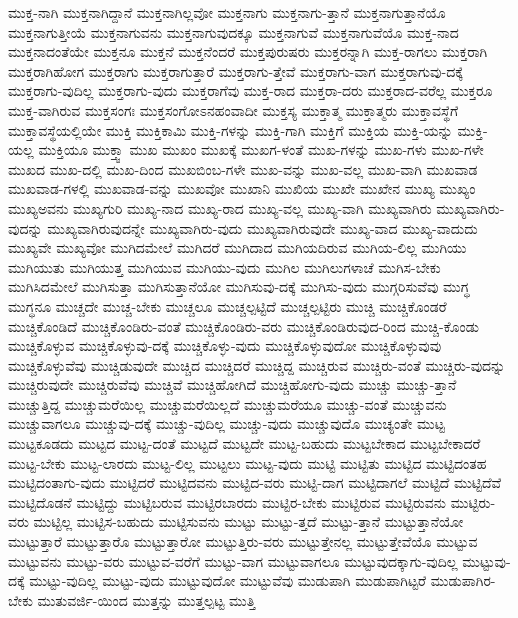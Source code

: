 {ಮುಕ್ತ-ನಾಗಿ
ಮುಕ್ತನಾಗಿದ್ದಾನೆ
ಮುಕ್ತನಾಗಿಲ್ಲವೋ
ಮುಕ್ತನಾಗು
ಮುಕ್ತನಾಗು-ತ್ತಾನೆ
ಮುಕ್ತನಾಗುತ್ತಾನೆಯೊ
ಮುಕ್ತನಾಗುತ್ತೀಯೆ
ಮುಕ್ತನಾಗುವನು
ಮುಕ್ತನಾಗುವುದಕ್ಕೂ
ಮುಕ್ತನಾಗುವೆ
ಮುಕ್ತನಾಗುವೆಯೊ
ಮುಕ್ತ-ನಾದ
ಮುಕ್ತನಾದಂತೆಯೇ
ಮುಕ್ತನೂ
ಮುಕ್ತನೆ
ಮುಕ್ತನೆಂದರೆ
ಮುಕ್ತಪುರುಷರು
ಮುಕ್ತರನ್ನಾಗಿ
ಮುಕ್ತ-ರಾಗಲು
ಮುಕ್ತರಾಗಿ
ಮುಕ್ತರಾಗಿಹೋಗ
ಮುಕ್ತರಾಗು
ಮುಕ್ತರಾಗುತ್ತಾರೆ
ಮುಕ್ತರಾಗು-ತ್ತೇವೆ
ಮುಕ್ತರಾಗು-ವಾಗ
ಮುಕ್ತರಾಗುವು-ದಕ್ಕೆ
ಮುಕ್ತರಾಗು-ವುದಿಲ್ಲ
ಮುಕ್ತರಾಗು-ವುದು
ಮುಕ್ತರಾಗೆವು
ಮುಕ್ತ-ರಾದ
ಮುಕ್ತರಾ-ದರು
ಮುಕ್ತರಾದ-ವರೆಲ್ಲ
ಮುಕ್ತರೂ
ಮುಕ್ತ-ವಾಗಿರುವ
ಮುಕ್ತಸಂಗಃ
ಮುಕ್ತಸಂಗೋಽನಹಂವಾದೀ
ಮುಕ್ತಸ್ಯ
ಮುಕ್ತಾತ್ಮ
ಮುಕ್ತಾತ್ಮರು
ಮುಕ್ತಾವಸ್ಥೆಗೆ
ಮುಕ್ತಾವಸ್ಥೆಯಲ್ಲಿಯೇ
ಮುಕ್ತಿ
ಮುಕ್ತಿಕಾಮಿ
ಮುಕ್ತಿ-ಗಳನ್ನು
ಮುಕ್ತಿ-ಗಾಗಿ
ಮುಕ್ತಿಗೆ
ಮುಕ್ತಿಯ
ಮುಕ್ತಿ-ಯನ್ನು
ಮುಕ್ತಿ-ಯಲ್ಲ
ಮುಕ್ತಿಯೂ
ಮುಕ್ತ್ವಾ
ಮುಖ
ಮುಖಂ
ಮುಖಕ್ಕೆ
ಮುಖಗ-ಳಂತೆ
ಮುಖ-ಗಳನ್ನು
ಮುಖ-ಗಳು
ಮುಖ-ಗಳೇ
ಮುಖದ
ಮುಖ-ದಲ್ಲಿ
ಮುಖ-ದಿಂದ
ಮುಖಬಿಂಬ-ಗಳೇ
ಮುಖ-ವನ್ನು
ಮುಖ-ವಲ್ಲ
ಮುಖ-ವಾಗಿ
ಮುಖವಾಡ
ಮುಖವಾಡ-ಗಳಲ್ಲಿ
ಮುಖವಾಡ-ವನ್ನು
ಮುಖವೋ
ಮುಖಾನಿ
ಮುಖಿಯ
ಮುಖೇ
ಮುಖೇನ
ಮುಖ್ಯ
ಮುಖ್ಯಂ
ಮುಖ್ಯಅವನು
ಮುಖ್ಯಗುರಿ
ಮುಖ್ಯ-ನಾದ
ಮುಖ್ಯ-ರಾದ
ಮುಖ್ಯ-ವಲ್ಲ
ಮುಖ್ಯ-ವಾಗಿ
ಮುಖ್ಯವಾಗಿರು
ಮುಖ್ಯವಾಗಿರು-ವುದನ್ನು
ಮುಖ್ಯವಾಗಿರುವುದನ್ನೇ
ಮುಖ್ಯವಾಗಿರು-ವುದು
ಮುಖ್ಯವಾಗಿರುವುದೇ
ಮುಖ್ಯ-ವಾದ
ಮುಖ್ಯ-ವಾದುದು
ಮುಖ್ಯವೇ
ಮುಖ್ಯವೋ
ಮುಗಿದಮೇಲೆ
ಮುಗಿದರೆ
ಮುಗಿದಾದ
ಮುಗಿಯದಿರುವ
ಮುಗಿಯ-ಲಿಲ್ಲ
ಮುಗಿಯು
ಮುಗಿಯುತು
ಮುಗಿಯುತ್ತ
ಮುಗಿಯುವ
ಮುಗಿಯು-ವುದು
ಮುಗಿಲ
ಮುಗಿಲುಗಳಾಚೆ
ಮುಗಿಸ-ಬೇಕು
ಮುಗಿಸಿದಮೇಲೆ
ಮುಗಿಸುತ್ತಾ
ಮುಗಿಸುತ್ತಾನೆಯೋ
ಮುಗಿಸುವು-ದಕ್ಕೆ
ಮುಗಿಸು-ವುದು
ಮುಗ್ಗರಿಸುವೆವು
ಮುಗ್ಧ
ಮುಗ್ಧನೂ
ಮುಚ್ಚದೇ
ಮುಚ್ಚ-ಬೇಕು
ಮುಚ್ಚಲೂ
ಮುಚ್ಚಲ್ಪಟ್ಟಿದೆ
ಮುಚ್ಚಲ್ಪಟ್ಟಿರು
ಮುಚ್ಚಿ
ಮುಚ್ಚಿಕೊಂಡರೆ
ಮುಚ್ಚಿಕೊಂಡಿದೆ
ಮುಚ್ಚಿಕೊಂಡಿರು-ವಂತೆ
ಮುಚ್ಚಿಕೊಂಡಿರು-ವರು
ಮುಚ್ಚಿಕೊಂಡಿರುವುದ-ರಿಂದ
ಮುಚ್ಚಿ-ಕೊಂಡು
ಮುಚ್ಚಿಕೊಳ್ಳುವ
ಮುಚ್ಚಿಕೊಳ್ಳುವು-ದಕ್ಕೆ
ಮುಚ್ಚಿಕೊಳ್ಳು-ವುದು
ಮುಚ್ಚಿಕೊಳ್ಳುವುದೋ
ಮುಚ್ಚಿಕೊಳ್ಳುವುವು
ಮುಚ್ಚಿಕೊಳ್ಳುವೆವು
ಮುಚ್ಚಿಡುವುದೇ
ಮುಚ್ಚಿದ
ಮುಚ್ಚಿದರೆ
ಮುಚ್ಚಿದ್ದ
ಮುಚ್ಚಿರುವ
ಮುಚ್ಚಿರು-ವಂತೆ
ಮುಚ್ಚಿರು-ವುದನ್ನು
ಮುಚ್ಚಿರುವುದೇ
ಮುಚ್ಚಿರುವೆವು
ಮುಚ್ಚಿವೆ
ಮುಚ್ಚಿಹೋಗಿದೆ
ಮುಚ್ಚಿಹೋಗು-ವುದು
ಮುಚ್ಚು
ಮುಚ್ಚು-ತ್ತಾನೆ
ಮುಚ್ಚುತ್ತಿದ್ದ
ಮುಚ್ಚುಮರೆಯಿಲ್ಲ
ಮುಚ್ಚುಮರೆಯಿಲ್ಲದೆ
ಮುಚ್ಚುಮರೆಯೂ
ಮುಚ್ಚು-ವಂತೆ
ಮುಚ್ಚುವನು
ಮುಚ್ಚುವಾಗಲೂ
ಮುಚ್ಚುವು-ದಕ್ಕೆ
ಮುಚ್ಚು-ವುದಿಲ್ಲ
ಮುಚ್ಚು-ವುದು
ಮುಚ್ಚುವುದೊ
ಮುಚ್ಯಂತೇ
ಮುಟ್ಟ
ಮುಟ್ಟಕೂಡದು
ಮುಟ್ಟದ
ಮುಟ್ಟ-ದಂತೆ
ಮುಟ್ಟದೆ
ಮುಟ್ಟದೇ
ಮುಟ್ಟ-ಬಹುದು
ಮುಟ್ಟಬೇಕಾದ
ಮುಟ್ಟಬೇಕಾದರೆ
ಮುಟ್ಟ-ಬೇಕು
ಮುಟ್ಟ-ಲಾರದು
ಮುಟ್ಟ-ಲಿಲ್ಲ
ಮುಟ್ಟಲು
ಮುಟ್ಟ-ವುದು
ಮುಟ್ಟಿ
ಮುಟ್ಟಿತು
ಮುಟ್ಟಿದ
ಮುಟ್ಟಿದಂತಹ
ಮುಟ್ಟಿದಂತಾಗು-ವುದು
ಮುಟ್ಟಿದರೆ
ಮುಟ್ಟಿದವನು
ಮುಟ್ಟಿದ-ವರು
ಮುಟ್ಟಿ-ದಾಗ
ಮುಟ್ಟಿದಾಗಲೆ
ಮುಟ್ಟಿದೆ
ಮುಟ್ಟಿದೆವೆ
ಮುಟ್ಟಿದೊಡನೆ
ಮುಟ್ಟಿದ್ದು
ಮುಟ್ಟಿಬರುವ
ಮುಟ್ಟಿರಬಾರದು
ಮುಟ್ಟಿರ-ಬೇಕು
ಮುಟ್ಟಿರುವ
ಮುಟ್ಟಿರುವನು
ಮುಟ್ಟಿರು-ವರು
ಮುಟ್ಟಿಲ್ಲ
ಮುಟ್ಟಿಸ-ಬಹುದು
ಮುಟ್ಟಿಸುವನು
ಮುಟ್ಟು
ಮುಟ್ಟು-ತ್ತದೆ
ಮುಟ್ಟು-ತ್ತಾನೆ
ಮುಟ್ಟುತ್ತಾನೆಯೋ
ಮುಟ್ಟುತ್ತಾರೆ
ಮುಟ್ಟುತ್ತಾರೊ
ಮುಟ್ಟುತ್ತಾರೋ
ಮುಟ್ಟುತ್ತಿರು-ವರು
ಮುಟ್ಟುತ್ತೇನಲ್ಲ
ಮುಟ್ಟುತ್ತೇವೆಯೊ
ಮುಟ್ಟುವ
ಮುಟ್ಟುವನು
ಮುಟ್ಟು-ವರು
ಮುಟ್ಟುವ-ವರೆಗೆ
ಮುಟ್ಟು-ವಾಗ
ಮುಟ್ಟುವಾಗಲೂ
ಮುಟ್ಟುವುದಕ್ಕಾಗು-ವುದಿಲ್ಲ
ಮುಟ್ಟುವು-ದಕ್ಕೆ
ಮುಟ್ಟು-ವುದಿಲ್ಲ
ಮುಟ್ಟು-ವುದು
ಮುಟ್ಟುವುದೋ
ಮುಟ್ಟುವೆವು
ಮುಡುಪಾಗಿ
ಮುಡುಪಾಗಿಟ್ಟರೆ
ಮುಡುಪಾಗಿರ-ಬೇಕು
ಮುತುವರ್ಜಿ-ಯಿಂದ
ಮುತ್ತನ್ನು
ಮುತ್ತಲ್ಪಟ್ಟ
ಮುತ್ತಿ
}
